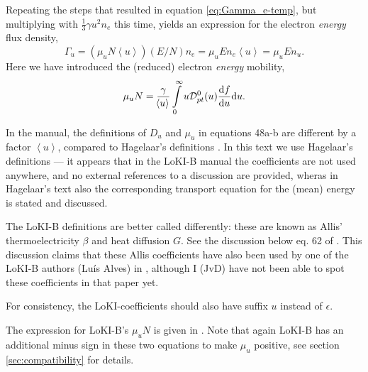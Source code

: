 \documentclass{book}
\newcommand{\MEAN}[1]{\ensuremath{\!\left\langle{{#1}}\right\rangle}}
\begin{document}
Repeating the steps that resulted in equation \eqref{eq:Gamma_e-temp}, but multiplying
with $\frac{1}{3}\gamma u^2 n_e$ this time, yields an expression for the electron
{\em energy} flux density,
\begin{equation}
	\Gamma_u = (\mu_uN\MEAN{u})(E/N)n_e = \mu_uE n_e\MEAN{u} = \mu_uE n_u.
	\label{eq:Gamma_u-temp}
\end{equation}
Here we have introduced the (reduced) electron {\em energy} mobility,
\begin{equation}
	\mu_uN = \frac{\gamma}{\MEAN{u}}\int\limits_0^\infty u{\cal D}_{pt}^0(u)\DERIV{f}{u}\dd{u}.
        \label{eq:muuN}
\end{equation}
\begin{framed}
In the manual, the definitions of $D_u$ and $\mu_u$ in equations 48a-b are different
by a factor $\MEAN{u}$, compared to Hagelaar's definitions \cite[eq. 61,62]{Hagelaar2005}.
In this text we use Hagelaar's definitions --- it appears that in the LoKI-B manual the
coefficients are not used anywhere, and no external references to a discussion are provided,
wheras in Hagelaar's text also the corresponding transport equation for the (mean) energy
is stated and discussed.

The LoKI-B definitions are better called differently: these are known as Allis'
thermoelectricity $\beta$ and heat diffusion $G$. See the discussion below eq. 62
of \cite{Hagelaar2005}. This discussion claims that these Allis coefficients have
also been used by one of the LoKI-B authors (Lu\'is Alves) in \cite{Alves1997},
although I (JvD) have not been able to spot these coefficients in that paper yet.

For consistency, the LoKI-coefficients should also have suffix $u$ instead of $\epsilon$.
\end{framed}
The expression for LoKI-B's $\mu_uN$ is given in \cite[eq. 48b]{Manual_2_2_0}.
Note that again LoKI-B has an additional minus sign in these two equations to make $\mu_u$
positive, see section \ref{sec:compatibility} for details.
\end{document}
